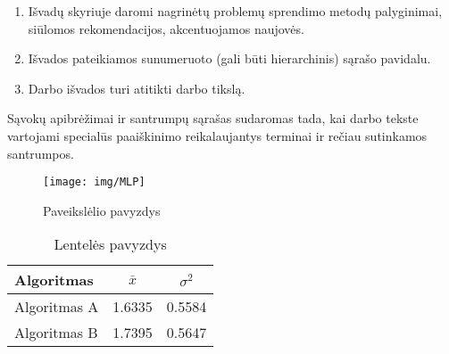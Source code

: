 \documentclass[
    monochrome, %
]{VUMIFSEMasterThesis}
\begin{document}
\begin{enumerate}[labelindent=0pt]
    \item Išvadų skyriuje daromi nagrinėtų problemų sprendimo metodų palyginimai, siūlomos
rekomendacijos, akcentuojamos naujovės.
    \item Išvados pateikiamos sunumeruoto (gali būti hierarchinis) sąrašo pavidalu.
    \item Darbo išvados turi atitikti darbo tikslą.
\end{enumerate}

\printbibliography[heading=bibintoc]  %

Sąvokų apibrėžimai ir santrumpų sąrašas sudaromas tada, kai darbo tekste
vartojami specialūs paaiškinimo reikalaujantys terminai ir rečiau sutinkamos
santrumpos.


\begin{figure}[H]
    \centering
    \texttt{[image: img/MLP]}
    \caption{Paveikslėlio pavyzdys}
    \label{img:mlp}
\end{figure}



\begin{table}[H]\footnotesize
  \centering
  \caption{Lentelės pavyzdys}
  {\begin{tabular}{|l|c|c|} \hline
    Algoritmas & $\bar{x}$ & $\sigma^{2}$ \\
    \hline
    Algoritmas A  & 1.6335    & 0.5584       \\
    Algoritmas B  & 1.7395    & 0.5647       \\
    \hline
  \end{tabular}}
  \label{tab:table example}
\end{table}
\end{document}
